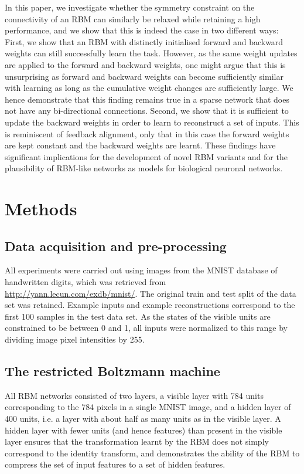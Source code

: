 \documentclass[11pt]{article}
\begin{document}
In this paper, we investigate whether the symmetry constraint on the
connectivity of an RBM can similarly be relaxed while retaining a high
performance, and we show that this is indeed the case in two different
ways: %
First, we show that an RBM with distinctly initialised forward and
backward weights can still successfully learn the task. However, as
the same weight updates are applied to the forward and backward
weights, one might argue that this is unsurprising as forward and
backward weights can become sufficiently similar with learning as long
as the cumulative weight changes are sufficiently large. We hence
demonstrate that this finding remains true in a sparse network that
does not have any bi-directional connections. %
Second, we show that it is sufficient to update the backward weights
in order to learn to reconstruct a set of inputs. This is reminiscent
of feedback alignment, only that in this case the forward weights are
kept constant and the backward weights are learnt. %
These findings have significant implications for the development of
novel RBM variants and for the plausibility of RBM-like networks as
models for biological neuronal networks.

\section{Methods}

\subsection{Data acquisition and pre-processing}

All experiments were carried out using images from the MNIST database
of handwritten digits, which was retrieved from
\url{http://yann.lecun.com/exdb/mnist/}. The original train and test
split of the data set was retained. Example inputs and example
reconstructions correspond to the first 100 samples in the test data
set. As the states of the visible units are constrained to be between
0 and 1, all inputs were normalized to this range by dividing image
pixel intensities by 255.

\subsection{The restricted Boltzmann machine}

All RBM networks consisted of two layers, a visible layer with 784
units corresponding to the 784 pixels in a single MNIST image, and a
hidden layer of 400 units, i.e. a layer with about half as many units
as in the visible layer. A hidden layer with fewer units (and hence
features) than present in the visible layer ensures that the
transformation learnt by the RBM does not simply correspond to the
identity transform, and demonstrates the ability of the RBM to
compress the set of input features to a set of hidden features.
\end{document}
